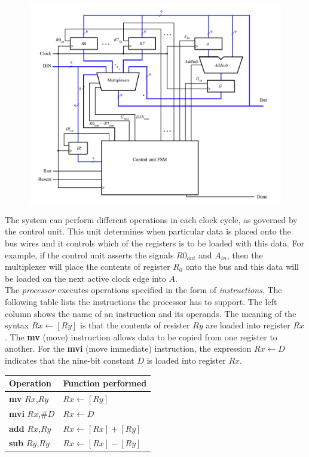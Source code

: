 \begin{figure}[h]
    \includegraphics[scale = 0.75]{source/picture/Lab09/Simple_Processor_Figure.png}
    \centering
\end{figure}
\newpage

The system can perform different operations in each clock cycle, as governed by the control unit. This unit determines when particular data is placed onto the bus wires and it controls which of the registers is to be loaded with this data. For example, if the control unit asserts the signals $R0_{out}$ and $A_{in}$, then the multiplexer will place the contents of register $R_0$ onto the bus and this data will be loaded on the next active clock edge into $A$.\bigskip\\
The \textit{processor} executes operations specified in the form of \textit{instructions}. The following table lists the instructions the processor has to support. The left column shows the name of an instruction and its operands. The meaning of the syntax $Rx \xleftarrow{} [Ry]$ is that the contents of resister $Ry$ are loaded into register $Rx$. The \textbf{mv} (move) instruction allows data to be copied from one register to another. For the \textbf{mvi} (move immediate) instruction, the expression $Rx \xleftarrow{} D$ indicates that the nine-bit constant $D$ is loaded into register $Rx$.\\
\begin{table}[h]
    \begin{tabular}{l|l}
        Operation    & Function performed \\ \hline
        \textbf{mv} $Rx$,$Ry$   & $Rx \xleftarrow{} [Ry]$ \\ \hline
        \textbf{mvi} $Rx$,\#$D$ & $Rx \xleftarrow{} D$ \\ \hline
        \textbf{add} $Rx$,$Ry$  & $Rx\xleftarrow{}[Rx]+[Ry]$ \\ \hline
        \textbf{sub} $Ry$,$Ry$  & $Rx\xleftarrow{}[Rx]-[Ry]$
    \end{tabular}
    \centering
\end{table}

